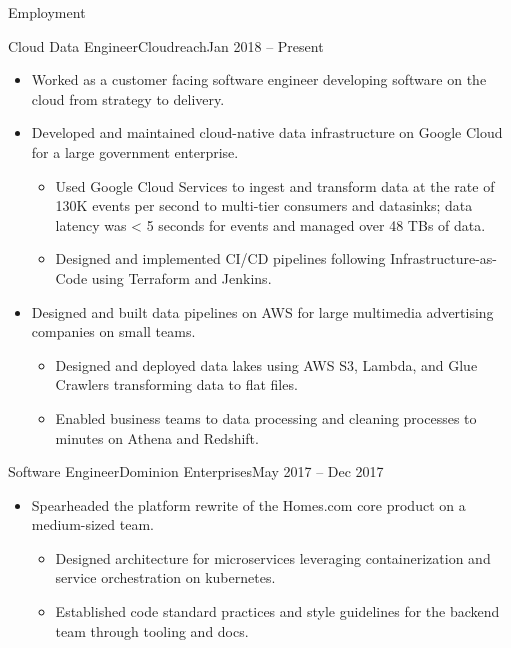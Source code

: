 \documentclass[]{mcdowellcv}
\begin{document}
    \makeheader

    \begin{cvsection}{Employment}


        \begin{cvsubsection}{Cloud Data Engineer}{Cloudreach}{Jan 2018 – Present}
            \begin{itemize}
                \item Worked as a customer facing software engineer developing software on the cloud from strategy to delivery. 
                \item Developed and maintained cloud-native data infrastructure on Google Cloud for a large government enterprise.
                    \begin{itemize}
                            \item Used Google Cloud Services to ingest and transform data at the rate of 130K events per second to multi-tier consumers and datasinks; data latency was < 5 seconds for events and managed over 48 TBs of data.
                            \item Designed and implemented CI/CD pipelines following Infrastructure-as-Code using Terraform and Jenkins.
                    \end{itemize}
                \end{itemize}
                \begin{itemize}
                    \item Designed and built data pipelines on AWS for large multimedia advertising companies on small teams.
                    \begin{itemize}
                        \item Designed and deployed data lakes using AWS S3, Lambda, and Glue Crawlers transforming data to flat files. 
                        \item Enabled business teams to data processing and cleaning processes to minutes on Athena and Redshift.
                    \end{itemize}
                \end{itemize}
        \end{cvsubsection}

        \begin{cvsubsection}{Software Engineer}{Dominion Enterprises}{May 2017 – Dec 2017}
            \begin{itemize}
                \item Spearheaded the platform rewrite of the Homes.com core product on a medium-sized team.
                \begin{itemize}
                    \item Designed architecture for microservices leveraging containerization and service orchestration on kubernetes. 
                    \item Established code standard practices and style guidelines for the backend team through tooling and docs.
                \end{itemize}
            \end{itemize}
        \end{cvsubsection}


\end{cvsection}
\end{document}
